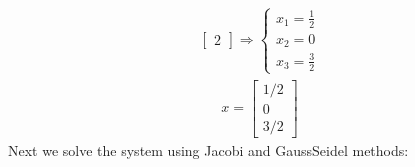 \documentclass[letterpaper,10pt,english]{jupyterBook}
\begin{document}
\begin{equation*}
\begin{split}
\begin{bmatrix}
2
\end{bmatrix}
\Rightarrow
\begin{cases}
x_1 = \frac{1}{2}\\
x_2 = 0\\
x_3 = \frac{3}{2}
\end{cases}
\end{split}
\end{equation*}\begin{equation*}
\begin{split}
x = 
\begin{bmatrix}
1/2\\
0\\
3/2
\end{bmatrix}
\end{split}
\end{equation*}
\sphinxAtStartPar
Next we solve the system using Jacobi and Gauss\sphinxhyphen{}Seidel methods:

\begin{sphinxVerbatim}[commandchars=\\\{\}]
   
 
\end{sphinxVerbatim}
\end{document}
